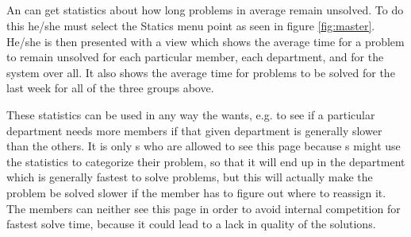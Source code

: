 \subsection{\gstat[c]}
An \admin[] can get statistics about how long problems in average remain unsolved.
To do this he/she must select the Statics menu point as seen in figure \ref{fig:master}.
He/she is then presented with a view which shows the average time for a problem to remain unsolved for each particular \astaff[] member, each department, and for the system over all.
It also shows the average time for problems to be solved for the last week for all of the three groups above.

These statistics can be used in any way the \admin[] wants, e.g. to see if a particular department needs more \astaff[] members if that given department is generally slower than the others.
It is only \admin s who are allowed to see this page because \aclient s might use the statistics to categorize their problem, so that it will end up in the department which is generally fastest to solve problems, but this will actually make the problem be solved slower if the \astaff[] member has to figure out where to reassign it.
The \astaff[] members can neither see this page in order to avoid internal competition for fastest solve time, because it could lead to a lack in quality of the solutions.


